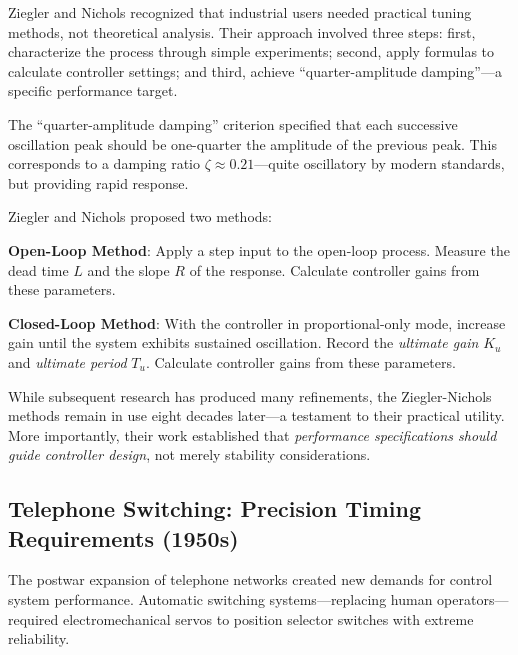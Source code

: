 \begin{historicalbox}
Ziegler and Nichols recognized that industrial users needed practical tuning methods, not theoretical analysis. Their approach involved three steps: first, characterize the process through simple experiments; second, apply formulas to calculate controller settings; and third, achieve ``quarter-amplitude damping''---a specific performance target.
\end{historicalbox}

The ``quarter-amplitude damping'' criterion specified that each successive oscillation peak should be one-quarter the amplitude of the previous peak. This corresponds to a damping ratio $\zeta \approx 0.21$---quite oscillatory by modern standards, but providing rapid response.

Ziegler and Nichols proposed two methods:

\textbf{Open-Loop Method}: Apply a step input to the open-loop process. Measure the dead time $L$ and the slope $R$ of the response. Calculate controller gains from these parameters.

\textbf{Closed-Loop Method}: With the controller in proportional-only mode, increase gain until the system exhibits sustained oscillation. Record the \textit{ultimate gain} $K_u$ and \textit{ultimate period} $T_u$. Calculate controller gains from these parameters.

While subsequent research has produced many refinements, the Ziegler-Nichols methods remain in use eight decades later---a testament to their practical utility. More importantly, their work established that \textit{performance specifications should guide controller design}, not merely stability considerations.

\subsection{Telephone Switching: Precision Timing Requirements (1950s)}

The postwar expansion of telephone networks created new demands for control system performance. Automatic switching systems---replacing human operators---required electromechanical servos to position selector switches with extreme reliability.

